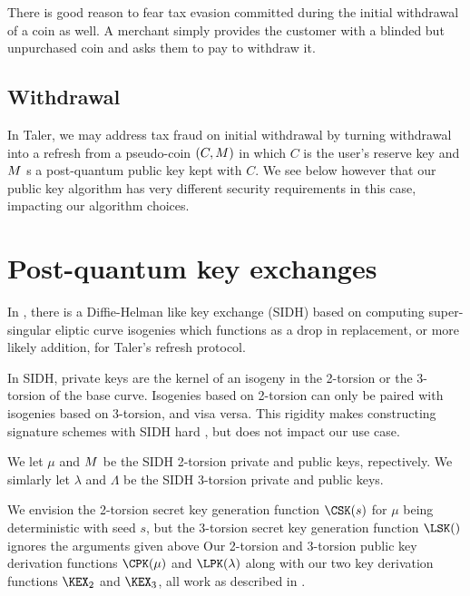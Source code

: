 \documentclass{llncs}
\begin{document}
\smallskip

There is good reason to fear tax evasion committed during the
initial withdrawal of a coin as well.  A merchant simply provides
the customer with a blinded but unpurchased coin and asks them to
pay to withdraw it.

\subsection{Withdrawal}\label{subsec:withdrawal}

In Taler, we may address tax fraud on initial withdrawal by turning
withdrawal into a refresh from a pseudo-coin $(C,M)$ in which 
 $C$ is the user's reserve key \cite[??]{Taler} and
 $M$ s a post-quantum public key kept with $C$.
We see below however that our public key algorithm has very different
security requirements in this case, impacting our algorithm choices.


\section{Post-quantum key exchanges}

In \cite{SIDH?,SIDH16}, there is a Diffie-Helman like key exchange
(SIDH) based on computing super-singular eliptic curve isogenies 
which functions as a drop in replacement, or more likely addition,
for Taler's refresh protocol.

In SIDH, private keys are the kernel of an isogeny in the 2-torsion
or the 3-torsion of the base curve.  Isogenies based on 2-torsion can
only be paired with isogenies based on 3-torsion, and visa versa.  
This rigidity makes constructing signature schemes with SIDH hard
\cite{}, but does not impact our use case.  

We let $\mu$ and $M$ be the SIDH 2-torsion private and public keys,
repectively.  We simlarly let $\lambda$ and $\Lambda$ be the
SIDH 3-torsion private and public keys.  

We envision the 2-torsion secret key generation function $\CSK(s)$
for $\mu$ being deterministic with seed $s$, but the 3-torsion secret
key generation function $\LSK()$ ignores the arguments given above 
Our 2-torsion and 3-torsion public key derivation functions
$\CPK(\mu)$ and $\LPK(\lambda)$ along with our two key derivation
functions $\KEX_2$ and $\KEX_3$, all work as described in
\cite[\S6]{SIDH16}.

\end{document}
